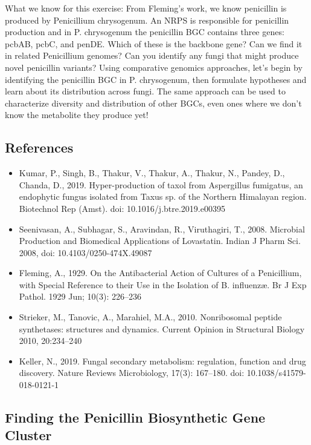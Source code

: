 \documentclass[
  letterpaper,
  DIV=11,
  numbers=noendperiod]{scrreprt}
\providecommand{\tightlist}{%
  \setlength{\itemsep}{0pt}\setlength{\parskip}{0pt}}
\begin{document}
What we know for this exercise: From Fleming's work, we know penicillin
is produced by Penicillium chrysogenum. An NRPS is responsible for
penicillin production and in P. chrysogenum the penicillin BGC contains
three genes: pcbAB, pcbC, and penDE. Which of these is the backbone
gene? Can we find it in related Penicillium genomes? Can you identify
any fungi that might produce novel penicillin variants? Using
comparative genomics approaches, let's begin by identifying the
penicillin BGC in P. chrysogenum, then formulate hypotheses and learn
about its distribution across fungi. The same approach can be used to
characterize diversity and distribution of other BGCs, even ones where
we don't know the metabolite they produce yet!

\subsection*{References}\label{references-1}

\begin{itemize}
\tightlist
\item
  Kumar, P., Singh, B., Thakur, V., Thakur, A., Thakur, N., Pandey, D.,
  Chanda, D., 2019. Hyper-production of taxol from Aspergillus
  fumigatus, an endophytic fungus isolated from Taxus sp. of the
  Northern Himalayan region. Biotechnol Rep (Amst). doi:
  10.1016/j.btre.2019.e00395
\item
  Seenivasan, A., Subhagar, S., Aravindan, R., Viruthagiri, T., 2008.
  Microbial Production and Biomedical Applications of Lovastatin. Indian
  J Pharm Sci. 2008, doi: 10.4103/0250-474X.49087
\item
  Fleming, A., 1929. On the Antibacterial Action of Cultures of a
  Penicillium, with Special Reference to their Use in the Isolation of
  B. influenzæ. Br J Exp Pathol. 1929 Jun; 10(3): 226--236
\item
  Strieker, M., Tanovic, A., Marahiel, M.A., 2010. Nonribosomal peptide
  synthetases: structures and dynamics. Current Opinion in Structural
  Biology 2010, 20:234--240
\item
  Keller, N., 2019. Fungal secondary metabolism: regulation, function
  and drug discovery. Nature Reviews Microbiology, 17(3): 167--180. doi:
  10.1038/s41579-018-0121-1
\end{itemize}

\subsection*{Finding the Penicillin Biosynthetic Gene
Cluster}\label{finding-the-penicillin-biosynthetic-gene-cluster}
\end{document}

